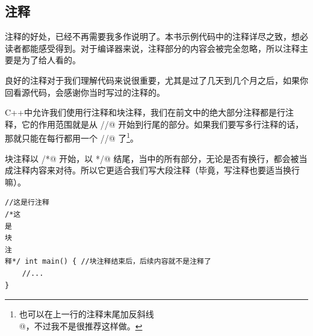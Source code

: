 \subsection*{注释}
注释的好处，已经不再需要我多作说明了。本书示例代码中的注释详尽之致，想必读者都能感受得到。对于编译器来说，注释部分的内容会被完全忽略，所以注释主要是为了给人看的。\par
良好的注释对于我们理解代码来说很重要，尤其是过了几天到几个月之后，如果你回看源代码，会感谢你当时写过的注释的。\par
C++中允许我们使用行注释和块注释，我们在前文中的绝大部分注释都是行注释，它的作用范围就是从 \lstinline@//@ 开始到行尾的部分。如果我们要写多行注释的话，那就只能在每行都用一个 \lstinline@//@ 了\footnote{也可以在上一行的注释末尾加反斜线 \lstinline@\\@，不过我不是很推荐这样做。}。\par
块注释以 \lstinline@/*@ 开始，以 \lstinline@*/@ 结尾，当中的所有部分，无论是否有换行，都会被当成注释内容来对待。所以它更适合我们写大段注释（毕竟，写注释也要适当换行嘛）。\par
\begin{lstlisting}
//这是行注释
/*这
是
块
注
释*/ int main() { //块注释结束后，后续内容就不是注释了
    //...
}
\end{lstlisting}\par
